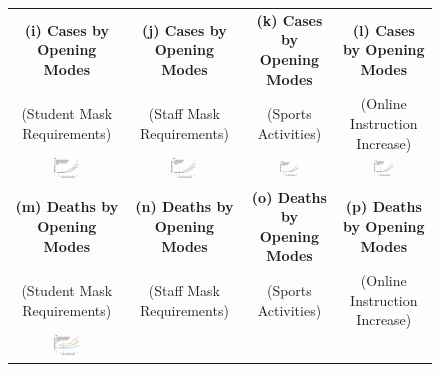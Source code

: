\documentclass[9pt,twoside,lineno]{pnas-new}
\theoremstyle{definition}
\begin{document}
\begin{figure}[ht]
{\begin{minipage}{\linewidth}
\begin{tabular}{cccc}
      \textbf{(i)     Cases by  Opening Modes }&\textbf{(j) Cases by  Opening Modes }&\textbf{(k) Cases by  Opening Modes}&\textbf{(l) Cases by  Opening Modes }\\
    (Student Mask Requirements)&(Staff Mask Requirements)&   (Sports Activities)&   (Online Instruction Increase) \\  
      \includegraphics[width=0.25\textwidth]{tables_and_figures/schoolmode-event-newcases}&  
      \includegraphics[width=0.25\textwidth]{tables_and_figures/schoolmode-event-staff-newcases}&  
      \includegraphics[width=0.25\textwidth]{tables_and_figures/schoolmode-event-sports-newcases}&  
      \includegraphics[width=0.25\textwidth]{tables_and_figures/schoolmode-event-online-newcases}  \\
    \textbf{(m)   Deaths by  Opening Modes }&\textbf{(n) Deaths by  Opening Modes }&\textbf{(o) Deaths by  Opening Modes}&\textbf{(p) Deaths  by  Opening Modes }\\
    (Student Mask Requirements)&(Staff Mask Requirements)&   (Sports Activities)&   (Online Instruction Increase) \\  
          \includegraphics[width=0.25\textwidth]{tables_and_figures/schoolmode-event-newdeaths}&  

\end{tabular}
\end{minipage}}
\end{figure}
\end{document}
